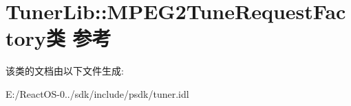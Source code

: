 \hypertarget{class_tuner_lib_1_1_m_p_e_g2_tune_request_factory}{}\section{Tuner\+Lib\+:\+:M\+P\+E\+G2\+Tune\+Request\+Factory类 参考}
\label{class_tuner_lib_1_1_m_p_e_g2_tune_request_factory}


该类的文档由以下文件生成\+:\begin{DoxyCompactItemize}
\item 
E\+:/\+React\+O\+S-\/0../sdk/include/psdk/tuner.\+idl\end{DoxyCompactItemize}
